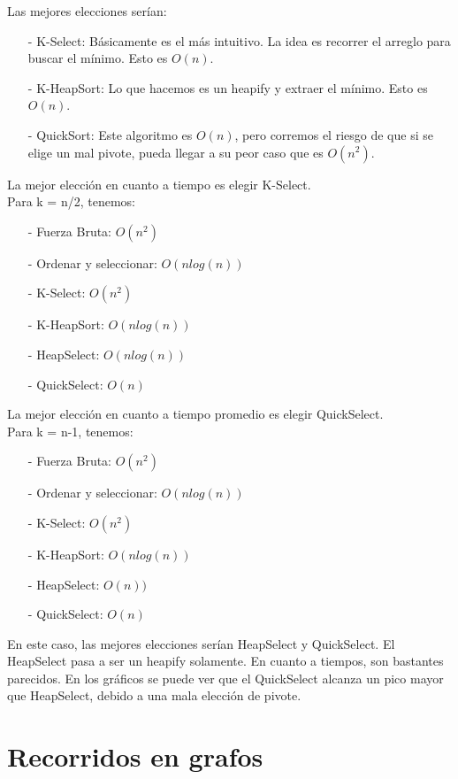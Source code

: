Las mejores elecciones serían:
\begin{itemize}
\item[-] K-Select: Básicamente es el más intuitivo. La idea es recorrer el arreglo para buscar el mínimo. Esto es $O(n)$.
\item[-] K-HeapSort: Lo que hacemos es un heapify y extraer el mínimo. Esto es $O(n)$.
\item[-] QuickSort: Este algoritmo es $O(n)$, pero corremos el riesgo de que si se elige un mal pivote, pueda llegar a su peor caso que es $O(n^2)$.
\end{itemize}
La mejor elección en cuanto a tiempo es elegir K-Select.
\\

Para k = n/2, tenemos:
\begin{itemize}
\item[-] Fuerza Bruta: $O(n^2)$
\item[-] Ordenar y seleccionar: $O(n log(n))$
\item[-] K-Select: $O(n^2)$
\item[-] K-HeapSort: $O(n log(n))$
\item[-] HeapSelect: $O(n log(n))$
\item[-] QuickSelect: $O(n)$
\end{itemize}

La mejor elección en cuanto a tiempo promedio es elegir QuickSelect.
\\


Para k = n-1, tenemos:
\begin{itemize}
\item[-] Fuerza Bruta: $O(n^2)$
\item[-] Ordenar y seleccionar: $O(n log(n))$
\item[-] K-Select: $O(n^2)$
\item[-] K-HeapSort: $O(n log(n))$
\item[-] HeapSelect: $O(n))$
\item[-] QuickSelect: $O(n)$
\end{itemize}

En este caso, las mejores elecciones serían HeapSelect y QuickSelect. El HeapSelect pasa a ser un heapify solamente. En cuanto a tiempos, son bastantes parecidos. En los gráficos se puede ver que el QuickSelect alcanza un pico mayor que HeapSelect, debido a una mala elección de pivote.

\newpage

\section{Recorridos en grafos}

